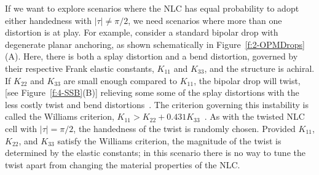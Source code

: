 If we want to explore scenarios where the NLC has equal probability to adopt either handedness with $|\tau| \neq \pi/2$, we need scenarios where more than one distortion is at play.
For example, consider a standard bipolar drop with degenerate planar anchoring, as shown schematically in Figure~\ref{f:2-OPMDrops}(A).
Here, there is both a splay distortion and a bend distortion, governed by their respective Frank elastic constants, $K_{11}$ and $K_{33}$, and the structure is achiral.
If $K_{22}$ and $K_{33}$ are small enough compared to $K_{11}$, the bipolar drop will twist, [see Figure~\ref{f:4-SSB}(B)] relieving some some of the splay distortions with the less costly twist and bend distortions~\cite{RN297,RN296,RN295}.
The criterion governing this instability is called the Williams criterion, $K_{11} > K_{22}+ 0.431 K_{33}$~\cite{RN297}.
As with the twisted NLC cell with $|\tau| = \pi/2$, the handedness of the twist is randomly chosen.
Provided $K_{11}$, $K_{22}$, and $K_{33}$ satisfy the Williams criterion, the magnitude of the twist is determined by the elastic constants; in this scenario there is no way to tune the twist apart from changing the material properties of the NLC.

